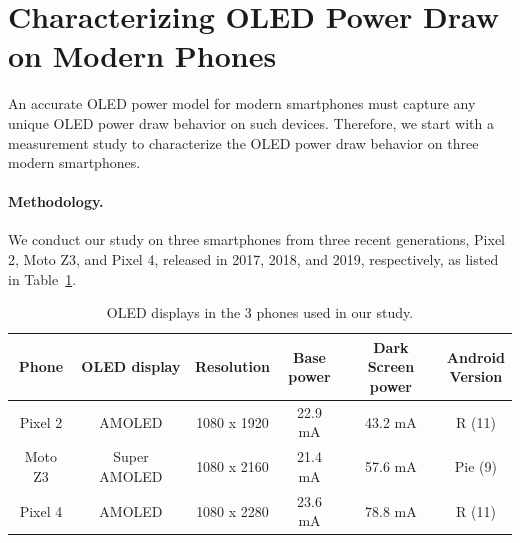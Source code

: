 \section{Characterizing OLED Power Draw on Modern Phones}
\label{sec:measurement}

An accurate OLED power model for modern smartphones must
capture any unique OLED power draw behavior on such
devices. Therefore, we start with a measurement study to characterize
the OLED power draw behavior on three modern smartphones.

%
\paragraph{Methodology.}
We conduct our study on three smartphones from three recent
generations, Pixel 2, Moto Z3, and Pixel 4,
released in 2017, 2018, and 2019, respectively, as listed in
Table~\ref{tab:phones}.

\begin{table}[tp]
\centering
\caption{{OLED displays in the 3 phones used in our study.}}
\label{tab:phones}
\vspace{-0.1in}
{\scriptsize
          \begin{tabular}{|c|c|c|c|c|c|}
          \hline
          Phone   & OLED display & Resolution  & \makecell{Base\\power} & \makecell{Dark Screen\\power} & \makecell{Android\\ Version} \\
          \hline
          Pixel 2 & AMOLED       & 1080 x 1920 & 22.9 mA  & 43.2 mA  & R (11) \\ 
          Moto Z3 & Super AMOLED & 1080 x 2160 & 21.4 mA  & 57.6 mA  & Pie (9) \\ 
          Pixel 4 & AMOLED       & 1080 x 2280 & 23.6 mA  & 78.8 mA  & R (11) \\
          \hline
          \end{tabular}
}
\vspace{-0.2in}
\end{table}

